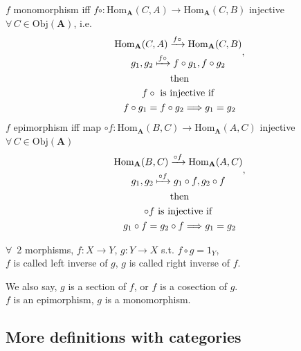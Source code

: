 \begin{proposition}
	$f$ monomorphism iff $f \circ : \text{Hom}_{\mathbf{A}}(C,A) \to \text{Hom}_{\mathbf{A}}(C,B)$ injective \, $\forall \, C \in \text{Obj}(\mathbf{A})$, i.e.
	\begin{equation}
	\begin{gathered}
\begin{gathered} 
	\text{Hom}_{\mathbf{A}}(C, A) \xrightarrow{f \circ } \text{Hom}_{\mathbf{A}}(C,B) \\
 g_1 , g_2 \xmapsto{f \circ} f\circ g_1 , f\circ g_2
\end{gathered}, \\ \text{ then } \\
f \circ \text{ is injective if } \\
	f \circ g_1 = f \circ g_2 \Longrightarrow g_1 = g_2
\end{gathered} 
	\end{equation}
$f$ epimorphism iff map $\circ f : \text{Hom}_{\mathbf{A}}(B,C) \to \text{Hom}_{\mathbf{A}}(A,C)$ injective $\forall \, C \in \text{Obj}(\mathbf{A})$
\begin{equation}
\begin{gathered}
\begin{gathered} 
\text{Hom}_{\mathbf{A}}(B, C) \xrightarrow{\circ f} \text{Hom}_{\mathbf{A}}(A,C) \\
g_1 , g_2  \xmapsto{ \circ f} g_1\circ f , g_2 \circ f
\end{gathered}, \\ \text{ then } \\
\circ f \text{ is injective if } \\ 
g_1 \circ f = g_2 \circ f \Longrightarrow g_1 = g_2
\end{gathered}
\end{equation}
\end{proposition}

\begin{definition}[inverses]
	$\forall \, $ 2 morphisms, $f:X\to Y$, $g: Y \to X$ s.t. $f\circ g= 1_Y$,\\
	$f$ is called left inverse of $g$, $g$ is called right inverse of $f$.
	
	We also say, $g$ is a section of $f$, or $f$ is a cosection of $g$. \\
	$f$ is an epimorphism, $g$ is a monomorphism.
\end{definition}

\subsection{More definitions with categories}

